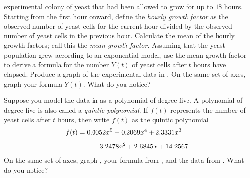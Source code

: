 \documentclass[a4paper,oneside,12pt]{article}
\begin{document}
\begin{problem}
\begin{packedenum}
    experimental colony of yeast that had been allowed to grow for up
    to $18$ hours.  Starting from the first hour onward, define the
    \emph{hourly growth factor} as the observed number of yeast cells
    for the current hour divided by the observed number of yeast cells
    in the previous hour.  Calculate the mean of the hourly growth
    factors; call this the \emph{mean growth factor}.  Assuming that
    the yeast population grew according to an exponential model, use
    the mean growth factor to derive a formula for the number $Y(t)$
    of yeast cells after $t$ hours have elapsed.  Produce a graph of
    the experimental data in .  On the
    same set of axes, graph your formula $Y(t)$.  What do you notice?

  \item\label{subprob:exponential:yeast_quintic_polynomial}
    Suppose you model the data in  as a
    polynomial of degree five.  A polynomial of degree five is also
    called a \emph{quintic polynomial}.  If $f(t)$ represents the
    number of yeast cells after $t$ hours, then write $f(t)$ as the
    quintic polynomial
    \begin{equation}
    \label{eqn:exponential:yeast_quintic_polynomial}
    \begin{aligned}
    f(t)
    &=
    0.0052x^5 - 0.2069x^4 + 2.3331x^3 \\[4pt]
    &\qquad-
    3.2478x^2 + 2.6845x + 14.2567.
    \end{aligned}
    \end{equation}
    On the same set of axes, graph
    , your formula
    from , and
    the data from .  What do you notice?


\end{packedenum}
\end{problem}
\end{document}
